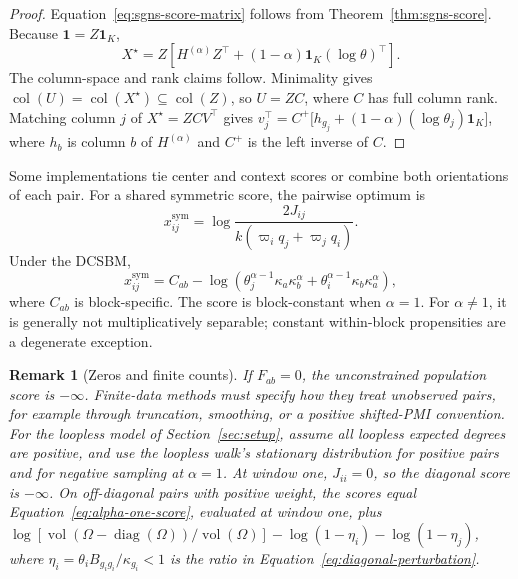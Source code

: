 \documentclass[aps,pre,reprint,superscriptaddress,longbibliography]{revtex4-2}
\newcommand{\ones}{\mathbf{1}}
\DeclareMathOperator{\vol}{vol}
\DeclareMathOperator{\diag}{diag}
\DeclareMathOperator{\col}{col}
\newtheorem{remark}[theorem]{Remark}
\begin{document}
\begin{proof}
Equation~\eqref{eq:sgns-score-matrix} follows from Theorem~\ref{thm:sgns-score}.
Because \(\ones=Z\ones_K\),
\begin{equation}
    X^\star
    =
    Z\left[
        H^{(\alpha)}Z^\top
        +(1-\alpha)\ones_K(\log\theta)^\top
    \right].
\end{equation}
The column-space and rank claims follow.
Minimality gives \(\col(U)=\col(X^\star)\subseteq\col(Z)\), so \(U=ZC\), where \(C\) has full column rank.
Matching column \(j\) of \(X^\star=ZCV^\top\) gives
\(v_j^\top=C^{+}\bigl[h_{g_j}+(1-\alpha)(\log\theta_j)\ones_K\bigr]\),
where \(h_b\) is column \(b\) of \(H^{(\alpha)}\) and \(C^{+}\) is the left inverse of \(C\).
\end{proof}

Some implementations tie center and context scores or combine both orientations of each pair.
For a shared symmetric score, the pairwise optimum is
\begin{equation}
    x^{\mathrm{sym}}_{ij}
    =
    \log
    \frac{2J_{ij}}
    {k(\varpi_iq_j+\varpi_jq_i)}.
    \label{eq:symmetric-score}
\end{equation}
Under the DCSBM,
\begin{equation}
    x^{\mathrm{sym}}_{ij}
    =
    C_{ab}
    -
    \log\left(
        \theta_j^{\alpha-1}\kappa_a\kappa_b^\alpha
        +\theta_i^{\alpha-1}\kappa_b\kappa_a^\alpha
    \right),
    \label{eq:symmetric-dcsbm-score}
\end{equation}
where \(C_{ab}\) is block-specific.
The score is block-constant when \(\alpha=1\).
For \(\alpha\neq 1\), it is generally not multiplicatively separable; constant within-block propensities are a degenerate exception.

\begin{remark}[Zeros and finite counts]
If \(F_{ab}=0\), the unconstrained population score is \(-\infty\).
Finite-data methods must specify how they treat unobserved pairs, for example through truncation, smoothing, or a positive shifted-PMI convention.
For the loopless model of Section~\ref{sec:setup}, assume all loopless expected degrees are positive, and use the loopless walk's stationary distribution for positive pairs and for negative sampling at \(\alpha=1\).
At window one, \(J_{ii}=0\), so the diagonal score is \(-\infty\).
On off-diagonal pairs with positive weight, the scores equal Equation~\eqref{eq:alpha-one-score}, evaluated at window one, plus
\(\log[\vol(\Omega-\diag(\Omega))/\vol(\Omega)]-\log(1-\eta_i)-\log(1-\eta_j)\),
where \(\eta_i=\theta_iB_{g_ig_i}/\kappa_{g_i}<1\) is the ratio in Equation~\eqref{eq:diagonal-perturbation}.
\end{remark}
\end{document}

